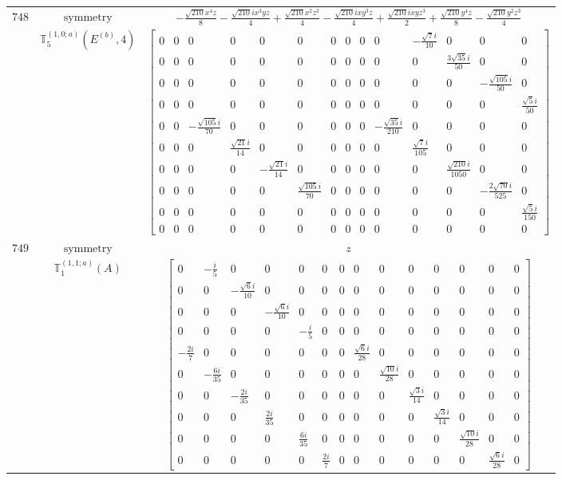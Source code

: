 \documentclass[fleqn,8pt,landscape]{jsarticle}
\begin{document}
\begin{longtable}{ccc}
$ 748 $ & $ \text{symmetry} $ & $ - \frac{\sqrt{210} x^{4} z}{8} - \frac{\sqrt{210} i x^{3} y z}{4} + \frac{\sqrt{210} x^{2} z^{3}}{4} - \frac{\sqrt{210} i x y^{3} z}{4} + \frac{\sqrt{210} i x y z^{3}}{2} + \frac{\sqrt{210} y^{4} z}{8} - \frac{\sqrt{210} y^{2} z^{3}}{4} $ \\
$  $ & $ \mathbb{T}_{5}^{(1,0;a)}(E^{(b)},4) $ & $ \begin{bmatrix} 0 & 0 & 0 & 0 & 0 & 0 & 0 & 0 & 0 & 0 & - \frac{\sqrt{7} i}{10} & 0 & 0 & 0 \\ 0 & 0 & 0 & 0 & 0 & 0 & 0 & 0 & 0 & 0 & 0 & \frac{3 \sqrt{35} i}{50} & 0 & 0 \\ 0 & 0 & 0 & 0 & 0 & 0 & 0 & 0 & 0 & 0 & 0 & 0 & - \frac{\sqrt{105} i}{50} & 0 \\ 0 & 0 & 0 & 0 & 0 & 0 & 0 & 0 & 0 & 0 & 0 & 0 & 0 & \frac{\sqrt{5} i}{50} \\ 0 & 0 & - \frac{\sqrt{105} i}{70} & 0 & 0 & 0 & 0 & 0 & 0 & - \frac{\sqrt{35} i}{210} & 0 & 0 & 0 & 0 \\ 0 & 0 & 0 & \frac{\sqrt{21} i}{14} & 0 & 0 & 0 & 0 & 0 & 0 & \frac{\sqrt{7} i}{105} & 0 & 0 & 0 \\ 0 & 0 & 0 & 0 & - \frac{\sqrt{21} i}{14} & 0 & 0 & 0 & 0 & 0 & 0 & \frac{\sqrt{210} i}{1050} & 0 & 0 \\ 0 & 0 & 0 & 0 & 0 & \frac{\sqrt{105} i}{70} & 0 & 0 & 0 & 0 & 0 & 0 & - \frac{2 \sqrt{70} i}{525} & 0 \\ 0 & 0 & 0 & 0 & 0 & 0 & 0 & 0 & 0 & 0 & 0 & 0 & 0 & \frac{\sqrt{5} i}{150} \\ 0 & 0 & 0 & 0 & 0 & 0 & 0 & 0 & 0 & 0 & 0 & 0 & 0 & 0 \end{bmatrix} $ \\ \hline
$ 749 $ & $ \text{symmetry} $ & $ z $ \\
$  $ & $ \mathbb{T}_{1}^{(1,1;a)}(A) $ & $ \begin{bmatrix} 0 & - \frac{i}{5} & 0 & 0 & 0 & 0 & 0 & 0 & 0 & 0 & 0 & 0 & 0 & 0 \\ 0 & 0 & - \frac{\sqrt{6} i}{10} & 0 & 0 & 0 & 0 & 0 & 0 & 0 & 0 & 0 & 0 & 0 \\ 0 & 0 & 0 & - \frac{\sqrt{6} i}{10} & 0 & 0 & 0 & 0 & 0 & 0 & 0 & 0 & 0 & 0 \\ 0 & 0 & 0 & 0 & - \frac{i}{5} & 0 & 0 & 0 & 0 & 0 & 0 & 0 & 0 & 0 \\ - \frac{2 i}{7} & 0 & 0 & 0 & 0 & 0 & 0 & \frac{\sqrt{6} i}{28} & 0 & 0 & 0 & 0 & 0 & 0 \\ 0 & - \frac{6 i}{35} & 0 & 0 & 0 & 0 & 0 & 0 & \frac{\sqrt{10} i}{28} & 0 & 0 & 0 & 0 & 0 \\ 0 & 0 & - \frac{2 i}{35} & 0 & 0 & 0 & 0 & 0 & 0 & \frac{\sqrt{3} i}{14} & 0 & 0 & 0 & 0 \\ 0 & 0 & 0 & \frac{2 i}{35} & 0 & 0 & 0 & 0 & 0 & 0 & \frac{\sqrt{3} i}{14} & 0 & 0 & 0 \\ 0 & 0 & 0 & 0 & \frac{6 i}{35} & 0 & 0 & 0 & 0 & 0 & 0 & \frac{\sqrt{10} i}{28} & 0 & 0 \\ 0 & 0 & 0 & 0 & 0 & \frac{2 i}{7} & 0 & 0 & 0 & 0 & 0 & 0 & \frac{\sqrt{6} i}{28} & 0 \end{bmatrix} $ \\ \hline

\end{longtable}
\end{document}
